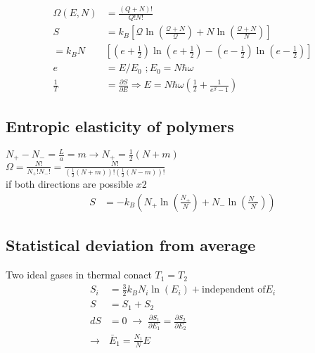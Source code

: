 \begin{equation*}
    \begin{aligned}
        \Omega(E,N) &= \frac{(Q+N)!}{Q!N!} \\
        S &= k_B \left[\mathcal{Q}\ln \left(\frac{\mathcal{Q}+N}{\mathcal{Q}}\right) + N \ln \left(\frac{\mathcal{Q}+N}{N}\right)\right] \\
          = k_B N &\left[(e + \frac{1}{2}) \ln (e + \frac{1}{2})- (e-\frac{1}{2}) \ln (e- \frac{1}{2})\right] \\
          e &= E/E_0 \,\, ; E_0 = N \hbar \omega \\
          \frac{1}{T} &= \frac{\partial S}{\partial E} \Rightarrow E = N \hbar \omega \left(\frac{1}{2} + \frac{1}{e^\beta -1}\right)
    \end{aligned}
\end{equation*}

\subsection*{Entropic elasticity of polymers}
$ N_+ - N_- = \frac{L}{a} = m \rightarrow N_+ = \frac{1}{2} \left(N + m\right)$\\
$\Omega = \frac{N!}{N_+ ! N_- !} = \frac{N!}{\left(\frac{1}{2}\left(N+m\right)\right)! \left(\frac{1}{2}\left(N-m\right)\right)!}$\\
if both directions are possible $x2$
\begin{equation*}
    \begin{aligned}
        S &= -k_B \left(N_+ \ln \left(\frac{N_+}{N}\right)+N_-\ln\left(\frac{N_-}{N}\right)\right)
    \end{aligned}
\end{equation*}

\subsection*{Statistical deviation from average}
Two ideal gases in thermal conact $T_1 = T_2$ 
\begin{equation*}
    \begin{aligned}
        S_i &= \frac{3}{2} k_B N_i \ln (E_i) + \text{independent of} E_i \\
        S &= S_1 + S_2 \\
        dS &= 0 \; \rightarrow \; \frac{\partial S_1}{\partial E_1} = \frac{\partial S_2}{\partial E_2} \\
        \rightarrow & \bar{E}_1 = \frac{N_1}{N} E
    \end{aligned}
\end{equation*}

